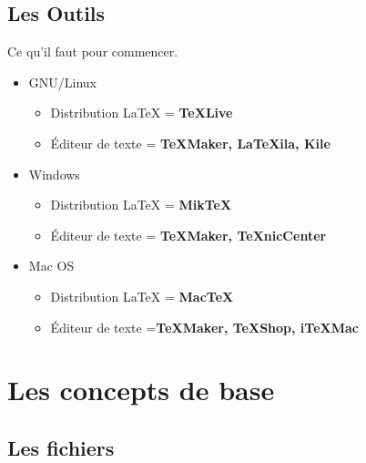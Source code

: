 \documentclass[10pt,svgnames,usenames,table]{beamer} %
\begin{document}
\subsection{Les Outils}
\begin{frame}{Ce qu'il faut pour commencer.}

  \begin{itemize}
	  \item GNU/Linux
	  \begin{itemize}
	  	\item Distribution \LaTeX{} = \textbf{TeXLive}
		\item Éditeur de texte = \textbf{TeXMaker, LaTeXila, Kile}
	  \end{itemize}
	  \item Windows
	  \begin{itemize}
	  	\item Distribution \LaTeX{} = \textbf{MikTeX}
		\item Éditeur de texte = \textbf{TeXMaker, TeXnicCenter}
	  \end{itemize}
	  \item Mac OS
	  \begin{itemize}
	  	\item Distribution \LaTeX{} = \textbf{MacTeX}
		\item Éditeur de texte =\textbf{TeXMaker, TeXShop, iTeXMac}
	  \end{itemize}
  \end{itemize}
\end{frame}

\section{Les concepts de base}
\subsection{Les fichiers}
\end{document}
